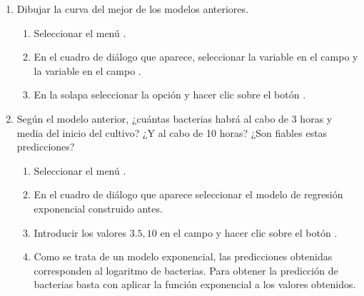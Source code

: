 \begin{enumerate}[leftmargin=*]
\begin{enumerate}
\item Dibujar la curva del mejor de los modelos anteriores.
\begin{indicacion}{
\begin{enumerate}
\item Seleccionar el menú .
\item En el cuadro de diálogo que aparece, seleccionar la variable  en el campo 
y la variable  en el campo .
\item En la solapa  seleccionar la opción  y hacer clic sobre el botón .
\end{enumerate}}
\end{indicacion}

\item Según el modelo anterior, ¿cuántas bacterias habrá al cabo de 3 horas y media del inicio del cultivo? 
¿Y al cabo de 10 horas? 
¿Son fiables estas predicciones?
\begin{indicacion}{
\begin{enumerate}
\item Seleccionar el menú .
\item En el cuadro de diálogo que aparece seleccionar el modelo de regresión exponencial construido antes.
\item Introducir los valores $3.5, 10$ en el campo  y hacer clic sobre el botón .
\item Como se trata de un modelo exponencial, las predicciones obtenidas corresponden al logaritmo de bacterias. 
Para obtener la predicción de bacterias basta con aplicar la función exponencial a los valores obtenidos.
\end{enumerate}}
\end{indicacion}


\end{enumerate}
\end{enumerate}
